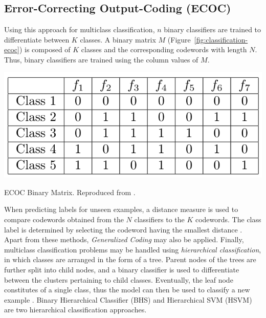 \subsection{Error-Correcting Output-Coding (ECOC)} 
Using this approach for multiclass classification, $n$ binary classifiers are trained to differentiate between $K$ classes. A binary matrix $M$ (Figure~\ref{fig:classification-ecoc}) is composed of $K$ classes and the corresponding codewords with length $N$. Thus, binary classifiers are trained using the column values of $M$.
\begin{marginfigure}
    \includegraphics{graphics/classification/ECOC.png}
    \caption{
    ECOC Binary Matrix. 
    Reproduced from \citet{aly2005}.
    }
    \label{fig:classification-ecoc}
\end{marginfigure} 
When predicting labels for unseen examples, a distance measure is used to compare codewords obtained from the $N$ classifiers to the $K$ codewords. The class label is determined by selecting the codeword having the smallest distance \citep{aly2005}. \\


Apart from these methods, \textit{Generalized Coding} \citep{allwein2001} may also be applied. Finally, multiclass classification problems may be handled using \textit{hierarchical classification}, in which classes are arranged in the form of a tree. Parent nodes of the trees are further split into child nodes, and a binary classifier is used to differentiate between the clusters pertaining to child classes. Eventually, the leaf node constitutes of a single class, thus the model can then be used to classify a new example \citep{aly2005}. Binary Hierarchical Classifier (BHS) \citep{kumar2002} and Hierarchical SVM (HSVM) \citep{yangchi2014} are two hierarchical classification approaches. 

